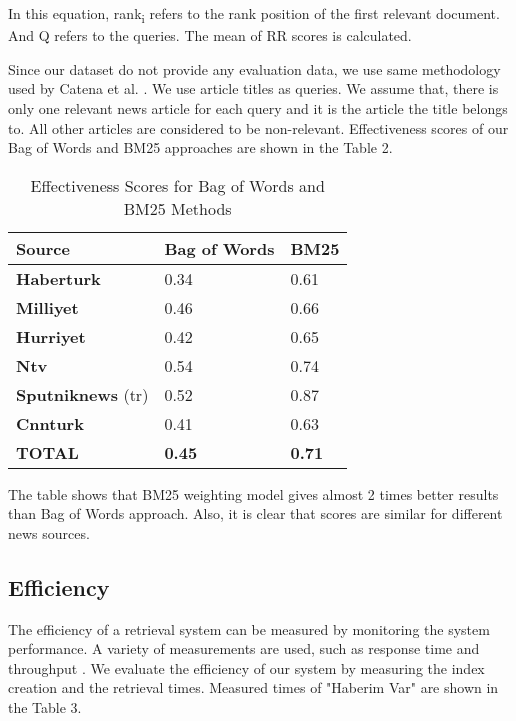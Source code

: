 \documentclass[conference]{IEEEtran}
\begin{document}
\begin{center}
\end{center}

In this equation, rank\textsubscript{i} refers to the rank position of the first relevant document. And Q refers to the queries. The mean of RR scores is calculated.

Since our dataset do not provide any evaluation data, we use same methodology used by Catena et al. \cite{enhanced_news_retrieval}. We use article titles as queries. We assume that, there is only one relevant news article for each query and it is the article the title belongs to. All other articles are considered to be non-relevant. Effectiveness scores of our Bag of Words and BM25 approaches are shown in the Table 2.
\\
\begin{table}[htbp]
\caption{Effectiveness Scores for Bag of Words and BM25 Methods}
\begin{center}
\begin{tabular}{|p{22mm}|p{20mm}|p{20mm}|}
\hline
\textbf{Source}& \textbf{Bag of Words}& \textbf{BM25} \\
\hline
\textbf{Haberturk} & 0.34 & 0.61 \\
\textbf{Milliyet} & 0.46 & 0.66 \\
\textbf{Hurriyet} & 0.42 & 0.65 \\
\textbf{Ntv} & 0.54 & 0.74 \\
\textbf{Sputniknews} (tr) & 0.52 & 0.87 \\
\textbf{Cnnturk} & 0.41 & 0.63 \\
\textbf{TOTAL} & \textbf{0.45} & \textbf{0.71} \\
\hline
\end{tabular}
\label{tab1}
\end{center}
\end{table}

The table shows that BM25 weighting model gives almost 2 times better results than Bag of Words approach. Also, it is clear that scores are similar for different news sources.

\subsection{Efficiency}
The efficiency of a retrieval system can be measured by monitoring the system performance. A variety of measurements are used, such as response time and throughput \cite{irbook}. We evaluate the efficiency of our system by measuring the index creation and the retrieval times. Measured times of "Haberim Var" are shown in the Table 3.
\end{document}
